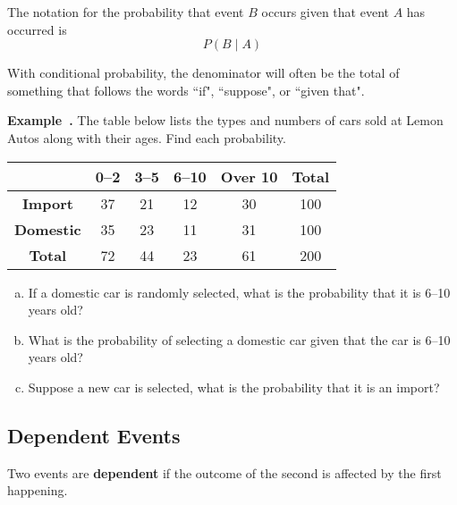 \documentclass{article}
\newcounter{example}[section]
\newenvironment{example}[1][]{\refstepcounter{example}\par\medskip
   {\color{red}\textbf{Example~\theexample. #1}}}{\medskip}
\begin{document}
\vspace{0.5in}

The notation for the probability that event $B$ occurs given that event $A$ has occurred is
\[ P(B \mid A)\]

\vspace{1in}

With conditional probability, the denominator will often be the total of something that follows the words ``if", ``suppose", or ``given that".
\vspace{1in}

\begin{example}
The table below lists the types and numbers of cars sold at Lemon Autos along with their ages. Find each probability.	\newline\\
\begin{center}
\begin{tabular}{c|ccccc}
					&	\textbf{0--2} & \textbf{3--5} & \textbf{6--10} & \textbf{Over 10} & \textbf{Total} \\ \hline
\textbf{Import} 	& 37 & 21 & 12 & 30 & 100 \\
\textbf{Domestic} 	& 35 & 23 & 11 & 31 & 100 \\ \hline
\textbf{Total}   	& 72 & 44 & 23 & 61 & 200
\end{tabular}
\end{center}

\begin{enumerate}[(a)]
    \item If a domestic car is randomly selected, what is the probability that it is 6--10 years old?    \vfill 
    \item What is the probability of selecting a domestic car given that the car is 6--10 years old?  \vfill 
    \item Suppose a new car is selected, what is the probability that it is an import?
\end{enumerate}
\end{example}

\vfill 
\newpage 

\subsection*{Dependent Events}

\vspace{0.25in}

\begin{tcolorbox}[colframe=green!20!black, colback = green!30!white,title=\textbf{Dependent Events}]
Two events are \textbf{dependent} if the outcome of the second is affected by the first happening.
\end{tcolorbox}
\vspace{1in}
\end{document}
